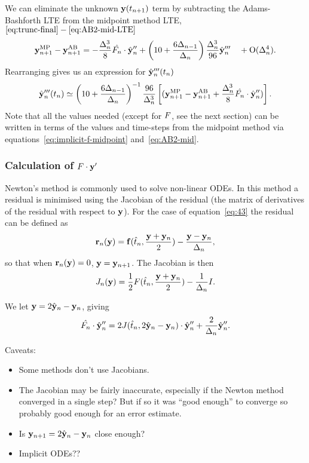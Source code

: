 We can eliminate the unknown $\mathbf{y}(t_{n+1})$ term by subtracting the Adams-Bashforth LTE from the midpoint method LTE, $\eqref{eq:trunc-final} - \eqref{eq:AB2-mid-LTE}$
\begin{equation}
 \mathbf{y}_{n+1}^{\text{MP}} - \mathbf{y}_{n+1}^{\text{AB}} =
  - \frac{\Delta_{n}^3}{8} \hat{F_{n}} \cdot \hat{\mathbf{y}}_{n}''
  + \left( 10 + \frac{6 \Delta_{n-1}}{\Delta_{n}} \right) \frac{\Delta_{n}^3}{96} \hat{\mathbf{y}}_{n}'''
  \quad + \text{O}(\Delta_{n}^4).
\end{equation}
Rearranging gives us an expression for $\hat{\mathbf{y}}_{n}'''(t_n)$
\begin{equation}
  \hat{\mathbf{y}}_{n}'''(t_n) \simeq
  \left( 10 + \frac{6 \Delta_{n-1}}{\Delta_{n}} \right)^{-1} \frac{96}{\Delta_{n}^3}
  \left[
    (\mathbf{y}_{n+1}^{\text{MP}} - \mathbf{y}_{n+1}^{\text{AB}} + \frac{\Delta_{n}^3}{8} \hat{F_{n}} \cdot \hat{\mathbf{y}}_{n}'')
    \right].
\end{equation}
Note that all the values needed (except for $F$, see the next section) can be written in terms of the values and time-steps from the midpoint method via equations~\eqref{eq:implicit-f-midpoint} and~\eqref{eq:AB2-mid}.


\subsubsection{Calculation of $F \cdot \mathbf{y}'$}

Newton's method is commonly used to solve non-linear ODEs.\cite{??ds}
In this method a residual is minimised using the Jacobian of the residual (the matrix of derivatives of the residual with respect to $\mathbf{y}$).
For the case of equation~\eqref{eq:43} the residual can be defined as\cite{??ds}
\begin{equation}
  \mathbf{r}_n(\mathbf{y}) = {\mathbf{f}}(\hat{t}_{n}, \frac{\mathbf{y} + \mathbf{y}_n}{2}) - \frac{\mathbf{y} - \mathbf{y}_{n}}{\Delta_{n}},
\end{equation}
so that when $\mathbf{r}_n(\mathbf{y}) =0$, $\mathbf{y} = \mathbf{y}_{n+1}$.
The Jacobian is then
\begin{equation}
  J_n(\mathbf{y}) = \frac{1}{2}F(\hat{t}_{n}, \frac{\mathbf{y} + \mathbf{y}_n}{2}) - \frac{1}{\Delta_{n}}I.
\end{equation}

We let $\mathbf{y} = 2 \hat{\mathbf{y}}_{n} - \mathbf{y}_n$, giving
\begin{equation}
  \hat{F_{n}} \cdot \hat{\mathbf{y}}_{n}'' = 2 J(\hat{t}_{n}, 2 \hat{\mathbf{y}}_{n} - \mathbf{y}_n) \cdot \hat{\mathbf{y}}_{n}'' + \frac{2}{\Delta_{n}} \hat{\mathbf{y}}_{n}''.
\end{equation}

Caveats:
\begin{itemize}
\item Some methods don't use Jacobians.
\item The Jacobian may be fairly inaccurate, especially if the Newton method converged in a single step? But if so it was ``good enough'' to converge so probably good enough for an error estimate.
\item Is $\mathbf{y}_{n+1} = 2 \hat{\mathbf{y}}_{n} - \mathbf{y}_n$ close enough?
\item Implicit ODEs??
\end{itemize}


